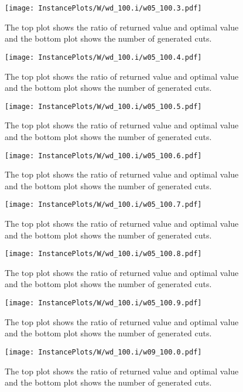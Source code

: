 \documentclass[10pt,a4paper]{article}
\begin{document}
\begin{figure}[H]
\texttt{[image: InstancePlots/W/wd\_100.i/w05\_100.3.pdf]}
\caption{The top plot shows the ratio of returned value and optimal value     and the bottom plot shows the number of generated cuts.}
\end{figure}

\begin{figure}[H]
\texttt{[image: InstancePlots/W/wd\_100.i/w05\_100.4.pdf]}
\caption{The top plot shows the ratio of returned value and optimal value     and the bottom plot shows the number of generated cuts.}
\end{figure}

\begin{figure}[H]
\texttt{[image: InstancePlots/W/wd\_100.i/w05\_100.5.pdf]}
\caption{The top plot shows the ratio of returned value and optimal value     and the bottom plot shows the number of generated cuts.}
\end{figure}

\begin{figure}[H]
\texttt{[image: InstancePlots/W/wd\_100.i/w05\_100.6.pdf]}
\caption{The top plot shows the ratio of returned value and optimal value     and the bottom plot shows the number of generated cuts.}
\end{figure}

\begin{figure}[H]
\texttt{[image: InstancePlots/W/wd\_100.i/w05\_100.7.pdf]}
\caption{The top plot shows the ratio of returned value and optimal value     and the bottom plot shows the number of generated cuts.}
\end{figure}

\begin{figure}[H]
\texttt{[image: InstancePlots/W/wd\_100.i/w05\_100.8.pdf]}
\caption{The top plot shows the ratio of returned value and optimal value     and the bottom plot shows the number of generated cuts.}
\end{figure}

\begin{figure}[H]
\texttt{[image: InstancePlots/W/wd\_100.i/w05\_100.9.pdf]}
\caption{The top plot shows the ratio of returned value and optimal value     and the bottom plot shows the number of generated cuts.}
\end{figure}

\begin{figure}[H]
\texttt{[image: InstancePlots/W/wd\_100.i/w09\_100.0.pdf]}
\caption{The top plot shows the ratio of returned value and optimal value     and the bottom plot shows the number of generated cuts.}
\end{figure}
\end{document}
